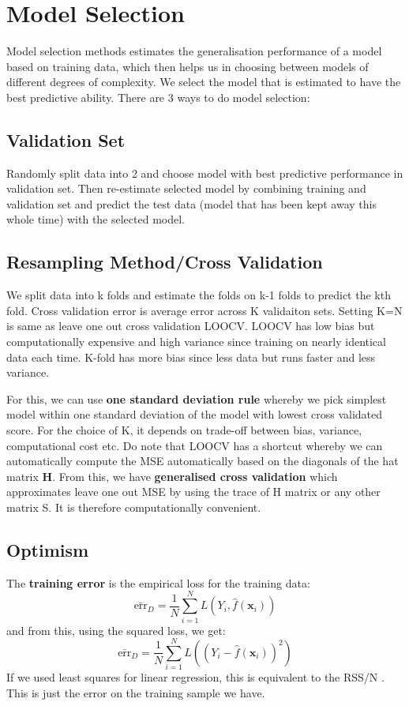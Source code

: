 \documentclass[11pt, oneside]{article}
\theoremstyle{definition}
\begin{document}
\newpage
\section{Model Selection}
Model selection methods estimates the generalisation performance of a model based on training data, which then helps us in choosing between models of different degrees of complexity. We select the model that is estimated to have the best predictive ability. There are 3 ways to do model selection:

\subsection{Validation Set}
Randomly split data into 2 and choose model with best predictive performance in validation set. Then re-estimate selected model by combining training and validation set and predict the test data (model that has been kept away this whole time) with the selected model.

\subsection{Resampling Method/Cross Validation}
We split data into k folds and estimate the folds on k-1 folds to predict the kth fold. Cross validation error is average error across K validaiton sets. Setting K=N is same as leave one out cross validation LOOCV. LOOCV has low bias but computationally expensive and high variance since training on nearly identical data each time. K-fold has more bias since less data but runs faster and less variance.

For this, we can use \textbf{one standard deviation rule} whereby we pick simplest model within one standard deviation of the model with lowest cross validated score. For the choice of K, it depends on trade-off between bias, variance, computational cost etc. Do note that LOOCV has a shortcut whereby we can automatically compute the MSE automatically based on the diagonals of the hat matrix \textbf{H}. From this, we have \textbf{generalised cross validation} which approximates leave one out MSE by using the trace of H matrix or any other matrix S. It is therefore computationally convenient.

\subsection{Optimism}
The \textbf{training error} is the empirical loss for the training data:
$$
\bar{\text{err}}_D = \frac{1}{N}\sum\limits_{i=1}^NL(Y_i,\hat{f}(\bm{x}_i))
$$
and from this, using the squared loss, we get:
$$
\bar{\text{err}}_D = \frac{1}{N}\sum\limits_{i=1}^NL((Y_i - \hat{f}(\bm{x}_i))^2)
$$
If we used least squares for linear regression, this is equivalent to the RSS/N . This is just the error on the training sample we have.
\end{document}
